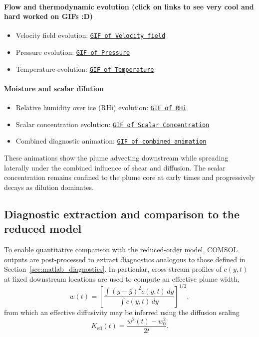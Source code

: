\documentclass[11pt]{article}
\begin{document}
\paragraph{Flow and thermodynamic evolution (click on links to see very cool and hard worked on GIFs :D)}
\begin{itemize}
\item Velocity field evolution:
\href{run:https://jumpshare.com/share/tsg11veOD7mxcaSBZTff}{\texttt{GIF of Velocity field}}
\item Pressure evolution:
\href{run:https://jumpshare.com/share/jxBsH8VZWwNd2hiq2hHm}{\texttt{GIF of Pressure}}
\item Temperature evolution:
\href{run:https://jumpshare.com/share/e9kANcUsdQniLVNUi2Wr}{\texttt{GIF of Temperature}}

\end{itemize}

\paragraph{Moisture and scalar dilution}
\begin{itemize}
\item Relative humidity over ice (RHi) evolution:
\href{run:https://jumpshare.com/share/vRPYYj6269of2rr7CPT4}{\texttt{GIF of RHi}}
\item Scalar concentration evolution:
\href{https://jumpshare.com/share/vzrJCuPj6kDWgZQWGpS9}{\texttt{GIF of Scalar Concentration}}
\item Combined diagnostic animation:
\href{run:https://jumpshare.com/share/RAviPkzhh5nMQkVhHzew}{\texttt{GIF of combined animation}}
\end{itemize}

These animations show the plume advecting downstream while spreading laterally under the
combined influence of shear and diffusion. The scalar concentration remains confined to
the plume core at early times and progressively decays as dilution dominates.

\subsection{Diagnostic extraction and comparison to the reduced model}
\label{sec:comsol_diagnostics}

To enable quantitative comparison with the reduced-order model, COMSOL outputs are
post-processed to extract diagnostics analogous to those defined in
Section~\ref{sec:matlab_diagnostics}. In particular, cross-stream profiles of $c(y,t)$ at
fixed downstream locations are used to compute an effective plume width,
\begin{equation}
w(t) = \left[
\frac{\int (y-\bar{y})^2 c(y,t)\,dy}{\int c(y,t)\,dy}
\right]^{1/2},
\label{eq:comsol_width}
\end{equation}
from which an effective diffusivity may be inferred using the diffusion scaling
\begin{equation}
K_{\mathrm{eff}}(t) = \frac{w^2(t)-w_0^2}{2t}.
\label{eq:comsol_keff}
\end{equation}
\end{document}
